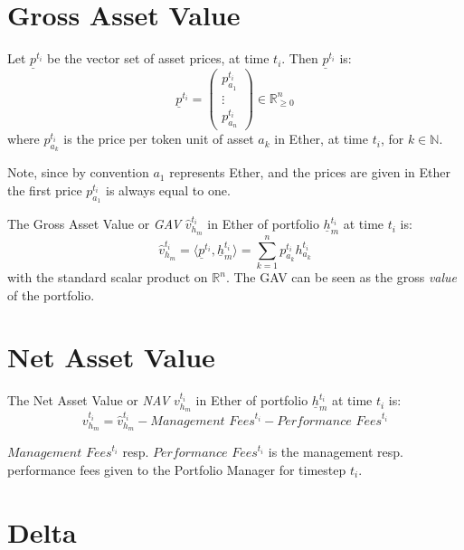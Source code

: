 \documentclass[conference]{IEEEtran}
\begin{document}
\section{Gross Asset Value}\label{app:defgav}

Let $\underline{p}^{t_i}$ be the vector set of asset prices, at time $t_i$. Then $\underline{p}^{t_i}$ is:
\begin{equation}
\underline{p}^{t_i} = \begin{pmatrix}p_{a_{1}}^{t_i}\\ \vdots \\ p_{a_{n}}^{t_i}\end{pmatrix} \in \mathbb{R}_{\geq 0}^n
\end{equation}
where $p_{a_{k}}^{t_i}$ is the price per token unit of asset $a_k$ in Ether, at time $t_i$, for $k \in \mathbb{N}$.

Note, since by convention $a_1$ represents Ether, and the prices are given in Ether the first price $p_{a_{1}}^{t_i}$ is always equal to one.

The Gross Asset Value or \textit{GAV} $\hat{v}_{h_m}^{t_i}$ in Ether of portfolio $\underline{h}_m^{t_i}$ at time $t_i$ is:
\begin{equation}
\hat{v}_{h_m}^{t_i} = \langle \underline{p}^{t_i}, \underline{h}_m^{t_i}\rangle = \sum_{k=1}^{n} p_{a_{k}}^{t_i}h_{a_{k}}^{t_i}
\end{equation}
with the standard scalar product on $\mathbb{R}^n$. The GAV can be seen as the gross \textit{value} of the portfolio.

\section{Net Asset Value}\label{app:defnav}

The Net Asset Value or \textit{NAV} $v_{h_m}^{t_i}$ in Ether of portfolio $\underline{h}_m^{t_i}$ at time $t_i$ is:
\begin{equation}
v_{h_m}^{t_i} = \hat{v}_{h_m}^{t_i} - \textit{Management Fees}^{t_i} - \textit{Performance Fees}^{t_i}
\end{equation}

$\textit{Management Fees}^{t_i}$ resp. $\textit{Performance Fees}^{t_i}$ is the management resp. performance fees given to the Portfolio Manager for timestep $t_i$.

\section{Delta}\label{app:defdelta}
\end{document}
